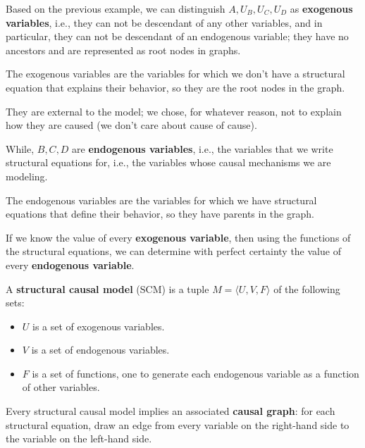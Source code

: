Based on the previous example, we can distinguish $A, U_B, U_C, U_D$ as \textbf{
    exogenous variables}, i.e., they can not be descendant of any other variables,
and in particular, they can not be descendant of an endogenous variable; they have
no ancestors and are represented as root nodes in graphs.

\begin{definition}
    The exogenous variables are the variables for which we don't have a structural
    equation that explains their behavior, so they are the root nodes in the graph.
\end{definition}

They are external to the model; we chose, for whatever reason, not to explain how
they are caused (we don't care about cause of cause).

While, $B, C, D$ are \textbf{endogenous variables}, i.e., the variables that we
write structural equations for, i.e., the variables whose causal mechanisms we
are modeling.

\begin{definition}
    The endogenous variables are the variables for which we have structural
    equations that define their behavior, so they have parents in the graph.
\end{definition}

If we know the value of every \textbf{exogenous variable}, then using the functions
of the structural equations, we can determine with perfect certainty the value
of every \textbf{endogenous variable}.

\begin{definition}
    A \textbf{structural causal model} (SCM) is a tuple $M = \langle U, V, F \rangle$
    of the following sets:
    \begin{itemize}
        \item $U$ is a set of exogenous variables.
        \item $V$ is a set of endogenous variables.
        \item $F$ is a set of functions, one to generate each endogenous variable
              as a function of other variables.
    \end{itemize}
\end{definition}

Every structural causal model implies an associated \textbf{causal graph}: for each
structural equation, draw an edge from every variable on the right-hand side to the
variable on the left-hand side.

